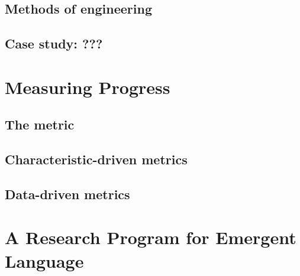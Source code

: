 \documentclass[letterpaper]{report}
\begin{document}
\section{Methods of engineering}
\section{Case study: ???}

\chapter{Measuring Progress}
\section{The metric}
\section{Characteristic-driven metrics}
\section{Data-driven metrics}

\chapter{A Research Program for Emergent Language}
\end{document}
